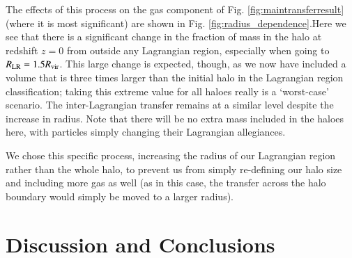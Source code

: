 \documentclass[fleqn,usenatbib]{mnras}
\begin{document}
The effects of this process on the gas component of Fig.
\ref{fig:maintransferresult} (where it is most significant) are shown in Fig.
\ref{fig:radius_dependence}.Here we see that there is a significant change in
the fraction of mass in the halo at redshift $z=0$ from outside any
Lagrangian region, especially when going to $R_{\rm LR} = 1.5 R_{\rm vir}$.
This large change is expected, though, as we now have included a volume that
is three times larger than the initial halo in the Lagrangian region
classification; taking this extreme value for all haloes really is a
`worst-case' scenario. The inter-Lagrangian transfer remains at a similar
level despite the increase in radius. Note that there will be no extra mass
included in the haloes here, with particles simply changing their Lagrangian
allegiances.

We chose this specific process, increasing the radius of our Lagrangian
region rather than the whole halo, to prevent us from simply re-defining our
halo size and including more gas as well (as in this case, the transfer
across the halo boundary would simply be moved to a larger radius).  \section{Discussion and Conclusions}
\label{sec:conclusions}
\end{document}
